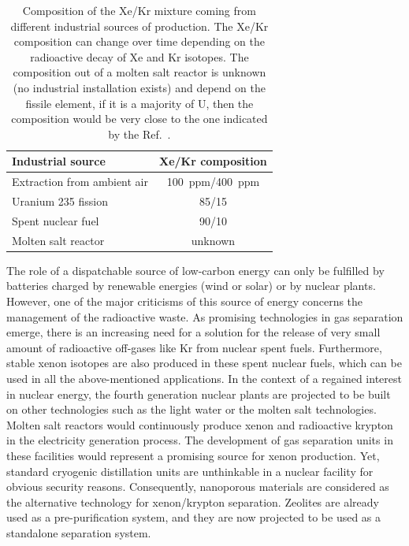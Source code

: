 \documentclass[main.tex]{subfiles}
\begin{document}
\begin{table}[ht]
\setlength{\extrarowheight}{1pt}
\centering
\begin{tabular}{|l|c|}
  \hline
  Industrial source  &  Xe/Kr composition  \\
  \hline
  Extraction from ambient air\autocite{kerry2007industrial} &  100~ppm/400~ppm  \\[0.5mm]
  Uranium 235 fission\autocite{Blades_1956} &  85/15 \\[0.5mm]
  Spent nuclear fuel\autocite{auerbach2003handbook} &  90/10  \\[0.5mm]
  Molten salt reactor\autocite{engel1971xenon,Riley_2019} &  unknown \\[0.5mm]
  \hline
\end{tabular}
\caption{Composition of the Xe/Kr mixture coming from different industrial sources of production. The Xe/Kr composition can change over time depending on the radioactive decay of Xe and Kr isotopes. The composition out of a molten salt reactor is unknown (no industrial installation exists) and depend on the fissile element, if it is a majority of U, then the composition would be very close to the one indicated by the Ref.~\cite{Blades_1956}. }\label{tab:indus_app}
\end{table}

The role of a dispatchable source of low-carbon energy can only be fulfilled by batteries charged by renewable energies (wind or solar) or by nuclear plants. However, one of the major criticisms of this source of energy concerns the management of the radioactive waste. As promising technologies in gas separation emerge, there is an increasing need for a solution for the release of very small amount of radioactive off-gases like Kr from nuclear spent fuels.\autocite{Blomeke_1969} Furthermore, stable xenon isotopes are also produced in these spent nuclear fuels, which can be used in all the above-mentioned applications. In the context of a regained interest in nuclear energy, the fourth generation nuclear plants are projected to be built on other technologies such as the light water or the molten salt technologies.\autocite{LeBlanc_2010} Molten salt reactors would continuously produce xenon and radioactive krypton in the electricity generation process.\autocite{Riley_2019} The development of gas separation units in these facilities would represent a promising source for xenon production. Yet, standard cryogenic distillation units are unthinkable in a nuclear facility for obvious security reasons. Consequently, nanoporous materials are considered as the alternative technology for xenon/krypton separation. Zeolites are already used as a pre-purification system,\autocite{kerry2007industrial} and they are now projected to be used as a standalone separation system. 
\end{document}

